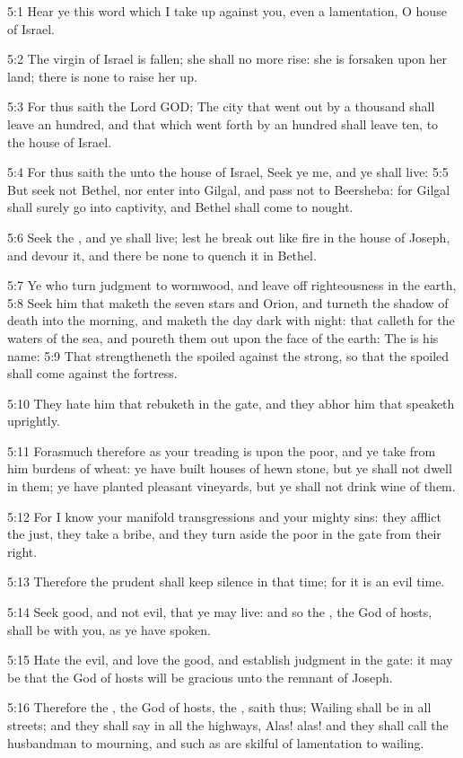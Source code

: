 5:1 Hear ye this word which I take up against you, even a lamentation,
O house of Israel.

5:2 The virgin of Israel is fallen; she shall no more rise: she is
forsaken upon her land; there is none to raise her up.

5:3 For thus saith the Lord GOD; The city that went out by a thousand
shall leave an hundred, and that which went forth by an hundred shall
leave ten, to the house of Israel.

5:4 For thus saith the \LORD unto the house of Israel, Seek ye me, and
ye shall live: 5:5 But seek not Bethel, nor enter into Gilgal, and
pass not to Beersheba: for Gilgal shall surely go into captivity, and
Bethel shall come to nought.

5:6 Seek the \LORD, and ye shall live; lest he break out like fire in
the house of Joseph, and devour it, and there be none to quench it in
Bethel.

5:7 Ye who turn judgment to wormwood, and leave off righteousness in
the earth, 5:8 Seek him that maketh the seven stars and Orion, and
turneth the shadow of death into the morning, and maketh the day dark
with night: that calleth for the waters of the sea, and poureth them
out upon the face of the earth: The \LORD is his name: 5:9 That
strengtheneth the spoiled against the strong, so that the spoiled
shall come against the fortress.

5:10 They hate him that rebuketh in the gate, and they abhor him that
speaketh uprightly.

5:11 Forasmuch therefore as your treading is upon the poor, and ye
take from him burdens of wheat: ye have built houses of hewn stone,
but ye shall not dwell in them; ye have planted pleasant vineyards,
but ye shall not drink wine of them.

5:12 For I know your manifold transgressions and your mighty sins:
they afflict the just, they take a bribe, and they turn aside the poor
in the gate from their right.

5:13 Therefore the prudent shall keep silence in that time; for it is
an evil time.

5:14 Seek good, and not evil, that ye may live: and so the \LORD, the
God of hosts, shall be with you, as ye have spoken.

5:15 Hate the evil, and love the good, and establish judgment in the
gate: it may be that the \LORD God of hosts will be gracious unto the
remnant of Joseph.

5:16 Therefore the \LORD, the God of hosts, the \LORD, saith thus;
Wailing shall be in all streets; and they shall say in all the
highways, Alas! alas!  and they shall call the husbandman to mourning,
and such as are skilful of lamentation to wailing.

